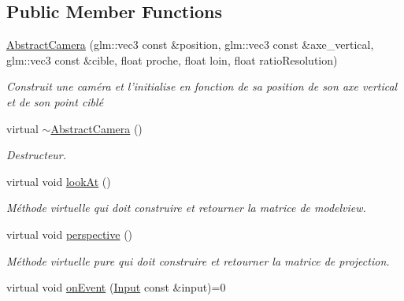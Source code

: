 \subsection*{Public Member Functions}
\begin{DoxyCompactItemize}
\item 
\hypertarget{classAbstractCamera_a880ce099ca5cba2cb9baada64fb605b5}{\hyperlink{classAbstractCamera_a880ce099ca5cba2cb9baada64fb605b5}{Abstract\+Camera} (glm\+::vec3 const \&position, glm\+::vec3 const \&axe\+\_\+vertical, glm\+::vec3 const \&cible, float proche, float loin, float ratio\+Resolution)}\label{classAbstractCamera_a880ce099ca5cba2cb9baada64fb605b5}

\begin{DoxyCompactList}\small\item\em Construit une caméra et l'initialise en fonction de sa position de son axe vertical et de son point ciblé \end{DoxyCompactList}\item 
\hypertarget{classAbstractCamera_addf550f9f41d04bd6651b19d795bdabe}{virtual \hyperlink{classAbstractCamera_addf550f9f41d04bd6651b19d795bdabe}{$\sim$\+Abstract\+Camera} ()}\label{classAbstractCamera_addf550f9f41d04bd6651b19d795bdabe}

\begin{DoxyCompactList}\small\item\em Destructeur. \end{DoxyCompactList}\item 
\hypertarget{classAbstractCamera_a12f6c58003bece7aa6cb66108a1cbeb1}{virtual void \hyperlink{classAbstractCamera_a12f6c58003bece7aa6cb66108a1cbeb1}{look\+At} ()}\label{classAbstractCamera_a12f6c58003bece7aa6cb66108a1cbeb1}

\begin{DoxyCompactList}\small\item\em Méthode virtuelle qui doit construire et retourner la matrice de modelview. \end{DoxyCompactList}\item 
\hypertarget{classAbstractCamera_a7d34830e280d6c40ce3ff22583054880}{virtual void \hyperlink{classAbstractCamera_a7d34830e280d6c40ce3ff22583054880}{perspective} ()}\label{classAbstractCamera_a7d34830e280d6c40ce3ff22583054880}

\begin{DoxyCompactList}\small\item\em Méthode virtuelle pure qui doit construire et retourner la matrice de projection. \end{DoxyCompactList}\item 
\hypertarget{classAbstractCamera_a5dab83f71c638eda31fc49db01f47180}{virtual void \hyperlink{classAbstractCamera_a5dab83f71c638eda31fc49db01f47180}{on\+Event} (\hyperlink{classInput}{Input} const \&input)=0}\label{classAbstractCamera_a5dab83f71c638eda31fc49db01f47180}


\end{DoxyCompactItemize}
